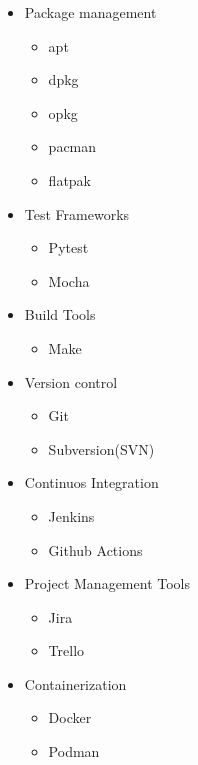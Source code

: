 \begin{itemize}
    \item Package management
    \begin{itemize}
        \item apt
        \item dpkg
        \item opkg
        \item pacman
        \item flatpak
    \end{itemize}

    \item Test Frameworks
    \begin{itemize}
        \item Pytest
        \item Mocha
    \end{itemize}

    \item Build Tools
    \begin{itemize}
        \item Make
    \end{itemize}

    \item Version control
    \begin{itemize}
        \item Git
        \item Subversion(SVN)
    \end{itemize}

    \item Continuos Integration
    \begin{itemize}
        \item Jenkins
        \item Github Actions
    \end{itemize}

    \item Project Management Tools
    \begin{itemize}
        \item Jira
        \item Trello
    \end{itemize}

    \item Containerization
    \begin{itemize}
        \item Docker
        \item Podman
    \end{itemize}

\end{itemize}


